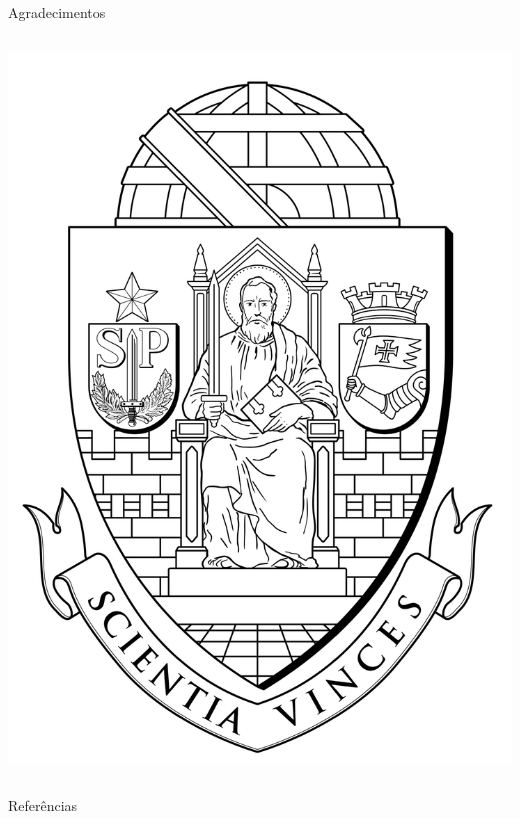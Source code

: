 \documentclass{beamer}
\begin{document}
\begin{frame}{Agradecimentos}
{\begin{columns}
\begin{column}{0.3\textwidth}
      \includegraphics[width=\columnwidth]{figuras/brasao_usp_pb}
    \end{column}
  \end{columns}
}
\end{frame}
\nocite{*}
\begin{frame}[allowframebreaks]{Referências}
\tiny
% 

%

\end{frame}

\begin{frame}[plain]
  \maketitle
\end{frame}
\end{document}
